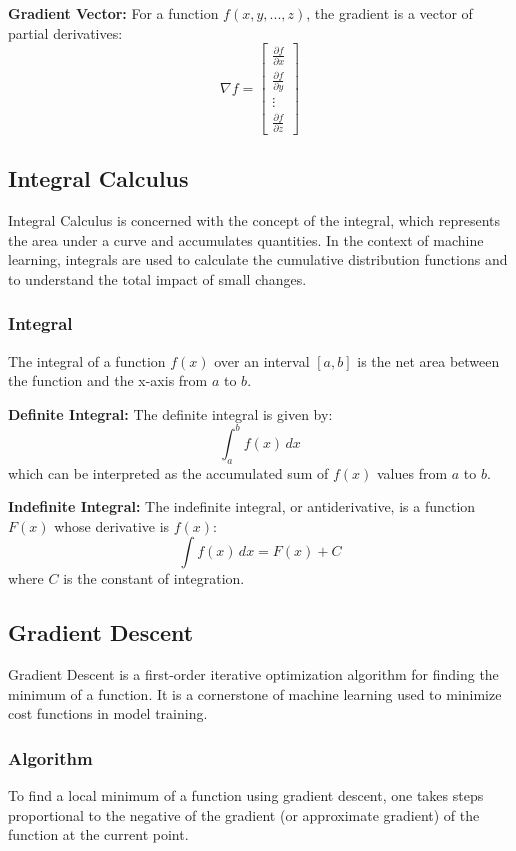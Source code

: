 \documentclass{article}
\begin{document}
	\textbf{Gradient Vector:}
	For a function \( f(x, y, ..., z) \), the gradient is a vector of partial derivatives:
	\[
	\nabla f = \begin{bmatrix}
		\frac{\partial f}{\partial x} \\
		\frac{\partial f}{\partial y} \\
		\vdots \\
		\frac{\partial f}{\partial z}
	\end{bmatrix}
	\]
	
	\subsection{Integral Calculus}
	Integral Calculus is concerned with the concept of the integral, which represents the area under a curve and accumulates quantities. In the context of machine learning, integrals are used to calculate the cumulative distribution functions and to understand the total impact of small changes.
	
	\subsubsection{Integral}
	The integral of a function \( f(x) \) over an interval \( [a, b] \) is the net area between the function and the x-axis from \( a \) to \( b \).
	
	\textbf{Definite Integral:}
	The definite integral is given by:
	\[
	\int_{a}^{b} f(x) \, dx
	\]
	which can be interpreted as the accumulated sum of \( f(x) \) values from \( a \) to \( b \).
	
	\textbf{Indefinite Integral:}
	The indefinite integral, or antiderivative, is a function \( F(x) \) whose derivative is \( f(x) \):
	\[
	\int f(x) \, dx = F(x) + C
	\]
	where \( C \) is the constant of integration.
	
	\subsection{Gradient Descent}
	Gradient Descent is a first-order iterative optimization algorithm for finding the minimum of a function. It is a cornerstone of machine learning used to minimize cost functions in model training.
	
	\subsubsection{Algorithm}
	To find a local minimum of a function using gradient descent, one takes steps proportional to the negative of the gradient (or approximate gradient) of the function at the current point.
	
\end{document}
